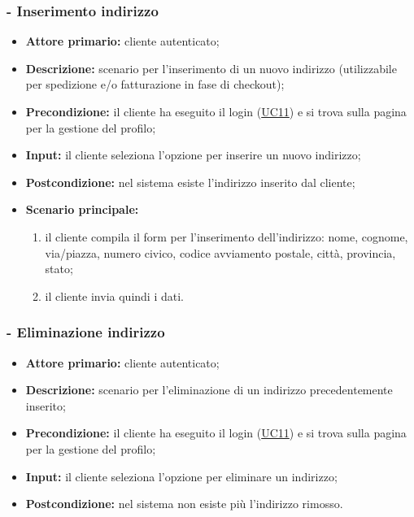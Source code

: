\stepsubUserCase
\subsubsection{ - Inserimento indirizzo}
\begin{itemize}
    \item \textbf{Attore primario:} cliente autenticato;
    \item \textbf{Descrizione:} scenario per l'inserimento di un nuovo indirizzo (utilizzabile per spedizione e/o fatturazione in fase di checkout);
    \item \textbf{Precondizione:} il cliente ha eseguito il login (\hyperref[UC11]{UC11}) e si trova sulla pagina per la gestione del profilo;
    \item \textbf{Input:} il cliente seleziona l'opzione per inserire un nuovo indirizzo;
    \item \textbf{Postcondizione:} nel sistema esiste l'indirizzo inserito dal cliente;
    \item \textbf{Scenario principale:}
          \begin{enumerate}
              \item il cliente compila il form per l'inserimento dell'indirizzo: nome, cognome, via/piazza, numero civico, codice avviamento postale, città, provincia, stato;
              \item il cliente invia quindi i dati.
          \end{enumerate}
\end{itemize}

\stepsubUserCase
\subsubsection{ - Eliminazione indirizzo}
\begin{itemize}
    \item \textbf{Attore primario:} cliente autenticato;
    \item \textbf{Descrizione:} scenario per l'eliminazione di un indirizzo precedentemente inserito;
    \item \textbf{Precondizione:} il cliente ha eseguito il login (\hyperref[UC11]{UC11}) e si trova sulla pagina per la gestione del profilo;
    \item \textbf{Input:} il cliente seleziona l'opzione per eliminare un indirizzo;
    \item \textbf{Postcondizione:} nel sistema non esiste più l'indirizzo rimosso.
\end{itemize}

